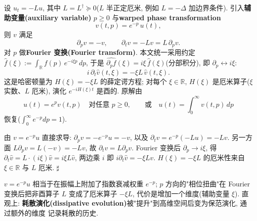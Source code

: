 \documentclass[utf8]{article} %
\numberwithin{equation}{section}   %
\newtheorem{Thm}{\hskip 2em {\color{blue} 定理}}[subsection]
\newtheorem{Note}{\hskip 2em {\color{red} 注}}[subsection]
\newenvironment{Proof}{{\noindent\it Proof:}\quad}{\hfill $\sharp $\par}
\begin{document}
\begin{Thm} \label{thm:schrodingerization}
    设 $u_t = -Lu$, 其中 $L = L^\dagger \succeq 0$($L$ 半正定厄米, 例如
    $L = -\Delta$ 加边界条件). 引入\textbf{辅助变量(auxiliary variable)} $p \ge 0$ 与\textbf{warped phase transformation}
    \begin{equation}
        v(t, p) = e^{-p}\, u(t),
    \end{equation}
    则 $v$ 满足
    \begin{equation}
        \partial_p v = -v, \qquad
        \partial_t v = -Lv = L\,\partial_p v.
    \end{equation}
    对 $p$ 做\textbf{Fourier 变换(Fourier transform)}. 本文统一采用约定
    $\hat f(\xi) := \int_{\mathbb R} f(p)\,e^{-i\xi p}\,dp$, 于是
    $\widehat{\partial_p f}(\xi) = i\xi\,\hat f(\xi)$(分部积分), 即 $\partial_p \leftrightarrow i\xi$:
    \begin{equation}
        i\, \partial_t \hat{v}(t, \xi) = -\xi L\, \hat{v}(t, \xi).
    \end{equation}
    这是哈密顿量为 $H(\xi) = -\xi L$ 的薛定谔方程; 对每个 $\xi \in \mathbb R$,
    $H(\xi)$ 是厄米算子($\xi$ 实数、$L$ 厄米), 演化 $e^{-iH(\xi)t}$ 是酉的. 原解由
    \begin{equation}
        u(t) = e^{p} v(t, p) \quad \text{对任意 } p \ge 0, \qquad
        \text{或} \quad
        u(t) = \int_0^\infty v(t, p)\, dp
    \end{equation}
    恢复($\int_0^\infty e^{-p}dp = 1$).
\end{Thm}

\begin{Proof}
    由 $v = e^{-p}u$ 直接求导: $\partial_p v = -e^{-p}u = -v$,
    以及 $\partial_t v = e^{-p}(-Lu) = -Lv$. 另一方面
    $L\partial_p v = L(-v) = -Lv$, 故 $\partial_t v = L\partial_p v$.
    Fourier 变换后 $\partial_p \to i\xi$, 得
    $\partial_t \hat v = L \cdot (i\xi)\hat v = i\xi L \hat v$,
    两边乘 $i$ 即 $i\partial_t\hat v = -\xi L\hat v$.
    $H(\xi) = -\xi L$ 的厄米性来自 $\xi \in \mathbb{R}$ 与 $L$ 厄米.
\end{Proof}

\begin{Note}
    $v = e^{-p}u$ 相当于在振幅上附加了指数衰减权重 $e^{-p}$;
    $p$ 方向的"相位扭曲"在 Fourier 变换后把非酉算子 $L$ 变成了厄米算子
    $-\xi L$, 代价是增加一个维度(辅助变量 $\xi$).
    直观上: \textbf{耗散演化(dissipative evolution)}被"提升"到高维空间后变为保范演化, 通过额外的维度
    记录耗散的历史.
\end{Note}
\end{document}
